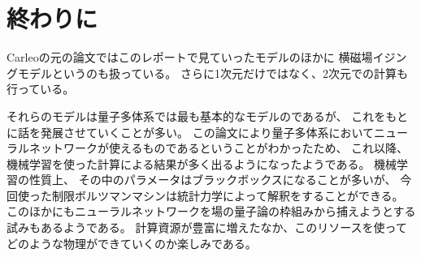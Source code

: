 \documentclass[twocolumn,10pt,dvipdfmx,a4paper]{jsarticle}
\begin{document}
\section{終わりに}
Carleoの元の論文\cite{Carleo-2017}ではこのレポートで見ていったモデルのほかに
横磁場イジングモデルというのも扱っている。
さらに1次元だけではなく、2次元での計算も行っている。

それらのモデルは量子多体系では最も基本的なモデルのであるが、
これをもとに話を発展させていくことが多い。
この論文により量子多体系においてニューラルネットワークが使えるものであるということがわかったため、
これ以降、機械学習を使った計算による結果が多く出るようになったようである。
機械学習の性質上、
その中のパラメータはブラックボックスになることが多いが、
今回使った制限ボルツマンマシンは統計力学によって解釈をすることができる。
このほかにもニューラルネットワークを場の量子論の枠組みから捕えようとする試みもあるようである。
計算資源が豊富に増えたなか、このリソースを使ってどのような物理ができていくのか楽しみである。



\end{document}
